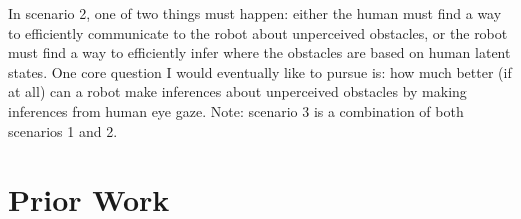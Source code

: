 \documentclass[conference]{IEEEtran}
\begin{document}
In scenario 2, one of two things must happen: either the human must find a way to efficiently communicate to the robot about unperceived obstacles, or the robot must find a way to efficiently infer where the obstacles are based on human latent states. One core question I would eventually like to pursue is: how much better (if at all) can a robot make inferences about unperceived obstacles by making inferences from human eye gaze. 
Note: scenario 3 is a combination of both scenarios 1 and 2. 

\section{Prior Work} 
\end{document}
